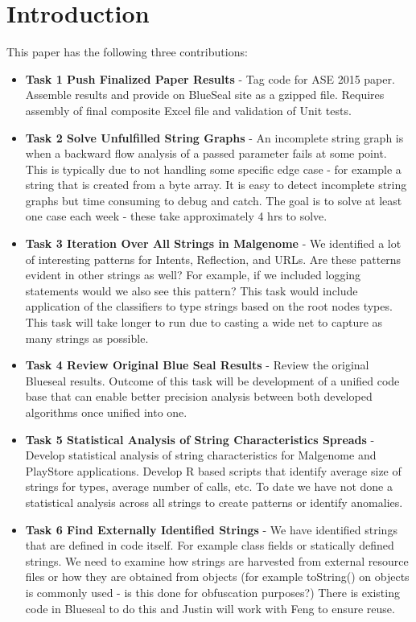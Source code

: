 \section{Introduction}
\label{sec:introduction}

 
This paper has the following three contributions:

\begin{itemize}
\item \textbf{Task 1 Push Finalized Paper Results} - Tag code for ASE 2015 paper.  Assemble results and provide on BlueSeal site as a gzipped file.  Requires assembly of final composite Excel file and validation of Unit tests.
\item \textbf{Task 2 Solve Unfulfilled String Graphs} - An incomplete string graph is when a backward flow analysis of a passed parameter fails at some point.  This is typically due to not handling some specific edge case - for example a string that is created from a byte array.  It is easy to detect incomplete string graphs but time consuming to debug and catch.  The goal is to solve at least one case each week - these take approximately 4 hrs to solve.
\item \textbf{Task 3 Iteration Over All Strings in Malgenome} - We identified a lot of interesting patterns for Intents, Reflection, and URLs.  Are these patterns evident in other strings as well?  For example, if we included logging statements would we also see this pattern?  This task would include application of the classifiers to type strings based on the root nodes types.  This task will take longer to run due to casting a wide net to capture as many strings as possible.
\item \textbf{Task 4 Review Original Blue Seal Results} - Review the original Blueseal results.  Outcome of this task will be development of a unified code base that can enable better precision analysis between both developed algorithms once unified into one.
\item \textbf{Task 5 Statistical Analysis of String Characteristics Spreads} - Develop statistical analysis of string characteristics for Malgenome and PlayStore applications.  Develop R based scripts that identify average size of strings for types, average number of calls, etc.  To date we have not done a statistical analysis across all strings to create patterns or identify anomalies. 
\item \textbf{Task 6 Find Externally Identified Strings} - We have identified strings that are defined in code itself.  For example class fields or statically defined strings.  We need to examine how strings are harvested from external resource files or how they are obtained from objects (for example toString() on objects is commonly used - is this done for obfuscation purposes?)  There is existing code in Blueseal to do this and Justin will work with Feng to ensure reuse.

\end{itemize}
